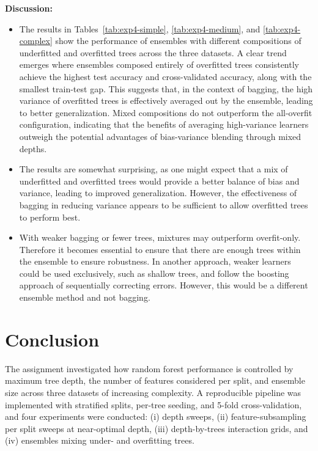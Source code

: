 \documentclass[conference]{IEEEtran}
\begin{document}
\textbf{Discussion:}
\begin{itemize}
  \item The results in Tables~\ref{tab:exp4-simple}, \ref{tab:exp4-medium}, and \ref{tab:exp4-complex} show the performance of ensembles with different
   compositions of underfitted and overfitted trees across the three datasets. A clear trend emerges where ensembles composed entirely of overfitted trees
    consistently achieve the highest test accuracy and cross-validated accuracy, along with the smallest train-test gap. This suggests that, in the context 
    of bagging, the high variance of overfitted trees is effectively averaged out by the ensemble, leading to better generalization. Mixed compositions
     do not outperform the all-overfit configuration, indicating that the benefits of averaging high-variance learners outweigh the potential advantages 
     of bias-variance blending through mixed depths.
  \item The results are somewhat surprising, as one might expect that a mix of underfitted and overfitted trees would provide a better balance of bias and variance,
   leading to improved generalization. However, the effectiveness of bagging in reducing variance appears to be sufficient to allow overfitted trees to perform best.
  \item With weaker bagging or fewer trees, mixtures may outperform overfit-only. Therefore it becomes essential to ensure that there are enough trees within the ensemble
  to ensure robustness. In another approach, weaker learners could be used exclusively, such as shallow trees, and follow the boosting approach of 
  sequentially correcting errors. However, this would be a different ensemble method and not bagging.
\end{itemize}



\section{Conclusion}

The assignment investigated how random forest performance is controlled by maximum tree depth, the number of features considered per split, and ensemble size across three datasets of increasing complexity. A reproducible pipeline was implemented with stratified splits, per-tree seeding, and 5-fold cross-validation, and four experiments were conducted: (i) depth sweeps, (ii) feature-subsampling per split sweeps at near-optimal depth, (iii) depth-by-trees interaction grids, and (iv) ensembles mixing under- and overfitting trees.
\end{document}
